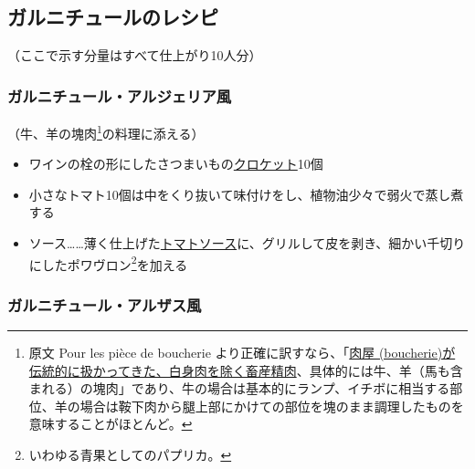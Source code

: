 \href{✓原稿下準備なし}{} \href{訳と注釈\%2020180420進行中}{}
\href{未、原文対照チェック}{} \href{未、日本語表現校正}{}
\href{未、注釈チェク}{} \href{未、原稿最終校正}{}

\hypertarget{garnitures-recettes}{%
\subsection{ガルニチュールのレシピ}\label{garnitures-recettes}}


\begin{center}
\medlarge（ここで示す分量はすべて仕上がり10人分）
\end{center}
\normalsize
\begin{recette}
\hypertarget{garniture-algerienne}{%
\subsubsection{ガルニチュール・アルジェリア風}\label{garniture-algerienne}}



（牛、羊の塊肉\footnote{原文 Pour les pièce de boucherie
  より正確に訳すなら、「\ul{肉屋
  (boucherie)が伝統的に扱かってきた、白身肉を除く畜産精肉}、具体的には牛、羊（馬も含まれる）の塊肉」であり、牛の場合は基本的にランプ、イチボに相当する部位、羊の場合は鞍下肉から腿上部にかけての部位を塊のまま調理したものを意味することがほとんど。}の料理に添える）

\begin{itemize}
\item
  ワインの栓の形にしたさつまいもの\protect\hyperlink{croquettes}{クロケット}10個
\item
  小さなトマト10個は中をくり抜いて味付けをし、植物油少々で弱火で蒸し煮する
\item
  ソース\ldots{}\ldots{}薄く仕上げた\protect\hyperlink{sauce-tomate}{トマトソース}に、グリルして皮を剥き、細かい千切りにしたポワヴロン\footnote{いわゆる青果としてのパプリカ。}を加える
\end{itemize}

\hypertarget{garniture-alsacienne}{%
\subsubsection{ガルニチュール・アルザス風}\label{garniture-alsacienne}}


\end{recette}
